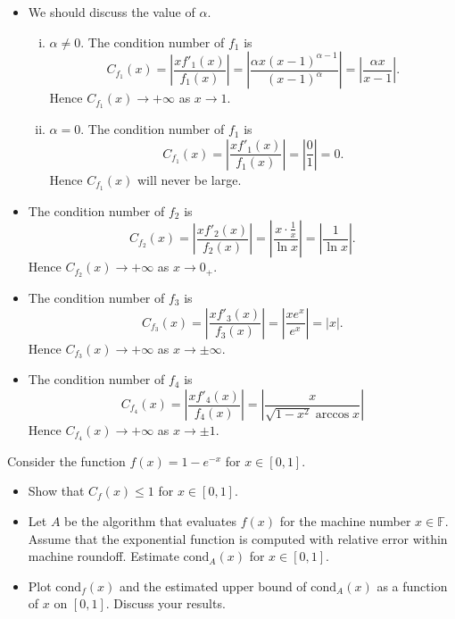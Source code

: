 \documentclass[11pt]{elegantbook}
\begin{document}
\begin{solution}
  \begin{itemize}
    \item We should discuss the value of $\alpha$.
    \begin{enumerate}[(i)]
      \item $\alpha\neq 0$. The condition number of $f_1$ is
      \begin{equation*}
        C_{f_1}(x)=\left|\frac{xf'_1(x)}{f_1(x)}\right|=\left|\frac{\alpha x(x-1)^{\alpha-1}}{(x-1)^\alpha}\right|=\left|\frac{\alpha x}{x-1}\right|.
      \end{equation*}
      Hence $C_{f_1}(x)\to +\infty$ as $x\to 1$.
      \item $\alpha=0$. The condition number of $f_1$ is
      \begin{equation*}
        C_{f_1}(x)=\left|\frac{xf'_1(x)}{f_1(x)}\right|=\left|\frac{0}{1}\right|=0.
      \end{equation*}
      Hence $C_{f_1}(x)$ will never be large.
    \end{enumerate}
    \item The condition number of $f_2$ is
    \begin{equation*}
      C_{f_2}(x)=\left|\frac{xf'_2(x)}{f_2(x)}\right|=\left|\frac{x \cdot \frac{1}{x}}{\ln x}\right|=\left| \frac{1}{\ln x} \right|.
    \end{equation*}
    Hence $C_{f_2}(x)\to +\infty$ as $x\to 0_+$.
    \item The condition number of $f_3$ is
    \begin{equation*}
      C_{f_3}(x)=\left|\frac{xf'_3(x)}{f_3(x)}\right|=\left|\frac{x e^x}{e^x}\right|=\left|x \right|.
    \end{equation*}
    Hence $C_{f_3}(x)\to +\infty$ as $x\to \pm \infty$.
    \item The condition number of $f_4$ is
    \begin{equation*}
      C_{f_4}(x)=\left|\frac{xf'_4(x)}{f_4(x)}\right|=\left| \frac{x}{\sqrt{1-x^2}\arccos x} \right|
    \end{equation*}
    Hence $C_{f_4}(x)\to +\infty$ as $x\to \pm 1$.
  \end{itemize}
\end{solution}

\vspace{1em}

\begin{problem}
  Consider the function $f(x)=1-e^{-x}$ for $x\in[0,1]$.
  \begin{itemize}
    \item Show that $C_f(x)\leq 1$ for $x\in[0,1]$.
    \item Let $A$ be the algorithm that evaluates $f(x)$ for the machine number $x\in\mathbb{F}$. Assume that the exponential function is computed with relative error within machine roundoff. Estimate $\text{cond}_A(x)$ for $x\in[0,1]$.
    \item Plot $\text{cond}_f(x)$ and the estimated upper bound of $\text{cond}_A(x)$ as a function of $x$ on $[0,1]$. Discuss your results.
  \end{itemize}
\end{problem}
\end{document}
